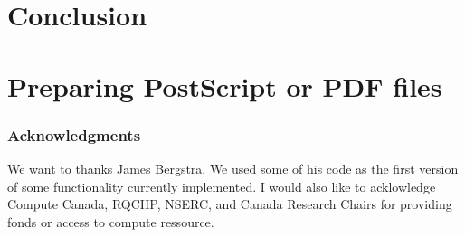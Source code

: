\documentclass{article} %
\begin{document}
\section{Conclusion}


\section{Preparing PostScript or PDF files}

% 
% 


\subsubsection*{Acknowledgments}

We want to thanks James Bergstra. We used some of his code as the first version of some functionality currently implemented. I would also like to acklowledge Compute Canada, RQCHP, NSERC, and Canada Research Chairs for providing fonds or access to compute ressource.




\end{document}
